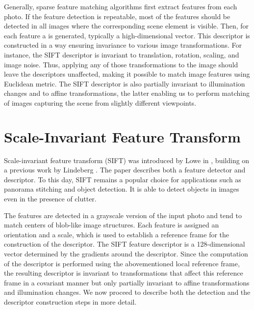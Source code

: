 Generally, sparse feature matching algorithms first extract features from each photo. %
If the feature detection is repeatable, most of the features should be detected in all images where the corresponding scene element is visible.
Then, for each feature a  is generated, typically a high-dimensional vector. 
This descriptor is constructed in a way ensuring invariance to various image transformations. 
For instance, the SIFT descriptor is invariant to translation, rotation, scaling, and image noise. 
Thus, applying any of those transformations to the image should leave the descriptors unaffected, making it possible to match image features using Euclidean metric. 
The SIFT descriptor is also partially invariant to illumination changes and to affine transformations, the latter enabling us to perform matching of images capturing the scene from slightly different viewpoints.
 
\section{Scale-Invariant Feature Transform}
\label{sec:sift}
Scale-invariant feature transform (SIFT) was introduced by Lowe in \cite{lowe1999}, building on a previous work by Lindeberg \cite{lindeberg1998}. 
The paper describes both a feature detector and descriptor.
To this day, SIFT remains a popular choice for applications such as panorama stitching and object detection.
It is able to detect objects in images even in the presence of clutter. 

The features are detected in a grayscale version of the input photo and tend to match centers of blob-like image structures.
Each feature is assigned an orientation and a scale, which is used to establish a reference frame for the construction of the descriptor. 
The SIFT feature descriptor is a 128-dimensional vector determined by the gradients around the descriptor.
Since the computation of the descriptor is performed using the abovementioned local reference frame, the resulting descriptor is invariant to transformations that affect this reference frame in a covariant manner but only partially invariant to affine transformations and illumination changes.
We now proceed to describe both the detection and the descriptor construction steps in more detail. 

